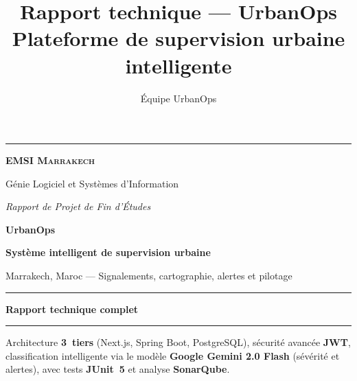 \documentclass[12pt,a4paper,oneside]{book} %
\title{Rapport technique — UrbanOps\\\large Plateforme de supervision urbaine intelligente}
\author{Équipe UrbanOps}
\date{}
\begin{document}
\begin{titlepage}
  \thispagestyle{empty}
  \centering
  \null\vspace*{0.8cm}

  {\color{UrbanBlue}\rule{0.82\textwidth}{2.2pt}}\par\vspace{0.75cm}

  {\Large\bfseries\textsc{EMSI Marrakech}}\par\vspace{0.2cm}
  {\large Génie Logiciel et Systèmes d'Information}\par\vspace{0.35cm}
  {\normalsize\itshape Rapport de Projet de Fin d'Études}\par\vspace{1.6cm}

  {\Huge\bfseries\color{UrbanBlue} UrbanOps}\par\vspace{0.45cm}
  {\LARGE\bfseries Système intelligent de supervision urbaine}\par\vspace{0.25cm}
  {\large Marrakech, Maroc — Signalements, cartographie, alertes et pilotage}\par\vspace{1.4cm}

  {\color{UrbanBlue}\rule{0.55\textwidth}{0.55pt}}\par\vspace{0.65cm}
  {\LARGE\bfseries Rapport technique complet}\par\vspace{0.55cm}
  {\color{UrbanBlue}\rule{0.55\textwidth}{0.55pt}}\par\vspace{1.6cm}

  \begin{minipage}{0.88\textwidth}\centering
    \color{UrbanGray}\large
    Architecture \textbf{3~tiers} (Next.js, Spring Boot, PostgreSQL), sécurité avancée \textbf{JWT}, classification intelligente via le modèle \textbf{Google Gemini 2.0 Flash} (sévérité et alertes), avec tests \textbf{JUnit~5} et analyse \textbf{SonarQube}.
  \end{minipage}\par\vfill


\end{titlepage}
\end{document}
